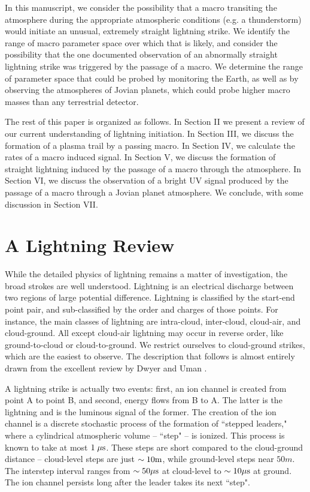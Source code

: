 \documentclass[%
 reprint,
 amsmath,amssymb,
 aps,
]{revtex4-2}
\begin{document}
    In this manuscript, we consider the possibility that a macro transiting the atmosphere during the appropriate atmospheric conditions (e.g. a thunderstorm) would initiate an unusual, extremely straight lightning strike. We identify the range of macro parameter space over which that is likely, and consider the possibility that the one documented observation of an abnormally straight lightning strike was triggered by the passage of a macro.  We determine the range of parameter space that could be probed by monitoring the Earth, as well as by observing the atmospheres of Jovian planets, which could probe higher macro masses than any terrestrial detector. 

    The rest of this paper is organized as follows. In Section II we present a review of our current understanding of lightning initiation. In Section III, we discuss the formation of a plasma trail by a passing macro. In Section IV, we calculate the rates of a macro induced signal. In Section V, we discuss the formation of straight lightning induced by the passage of a macro through the atmosphere. In Section VI, we discuss the observation of a bright UV signal produced by the passage of a macro through a Jovian planet atmosphere. We conclude, with some discussion in Section VII.



\section{A Lightning Review} %
\label{sec:a_lightning_review}

    While the detailed physics of lightning remains a matter of investigation, the broad strokes are well understood. Lightning is an electrical discharge between two regions of large potential difference. Lightning is classified by the start-end point pair, and sub-classified by the order and charges of those points. For instance, the main classes of lightning are intra-cloud, inter-cloud, cloud-air, and cloud-ground. All except cloud-air lightning may occur in reverse order, like ground-to-cloud or cloud-to-ground. We restrict ourselves to cloud-ground strikes, which are the easiest to observe. The description that follows is almost entirely drawn from the excellent review by Dwyer and Uman \citep{DwyerUman2014}.

    A lightning strike is actually two events: first, an ion channel is created from point A to point B, and second, energy flows from B to A. The latter is the lightning and is the luminous signal of the former.  The creation of the ion channel is a discrete stochastic process of the formation of ``stepped leaders," where a cylindrical atmospheric volume -- ``step" -- is ionized. This process is known to take at most $1 \; \mu\rm{s}$. These steps are  short compared to the cloud-ground distance -- cloud-level steps  are just $\sim10 \rm{m}$, while ground-level steps near $50 m$. The interstep interval ranges from  $\sim50 \mu\rm{s}$ at cloud-level to $\sim10 \mu\rm{s}$ at ground. The ion channel persists long after the leader takes its next ``step". 
\end{document}
